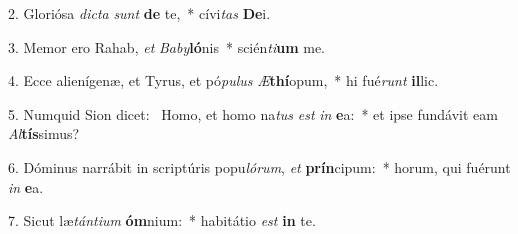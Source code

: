 2. Gloriósa \textit{dic}\textit{ta} \textit{sunt} \textbf{de} te,~*  cívi\textit{tas} \textbf{De}i.\

3. Memor ero Rahab, \textit{et} \textit{Ba}\textit{by}\textbf{ló}nis~*  scién\textit{ti}\textbf{um} me.\

4. Ecce alienígenæ, et Tyrus, et pó\textit{pu}\textit{lus} \textit{Æ}\textbf{thí}opum,~*  hi fué\textit{runt} \textbf{il}lic.\

5. Numquid Sion dicet: \dag\  Homo, et homo na\textit{tus} \textit{est} \textit{in} \textbf{e}a:~*  et ipse fundávit eam \textit{Al}\textbf{tís}simus?\

6. Dóminus narrábit in scriptúris popu\textit{ló}\textit{rum}, \textit{et} \textbf{prín}cipum:~*  horum, qui fuérunt \textit{in} \textbf{e}a.\

7. Sicut læ\textit{tán}\textit{ti}\textit{um} \textbf{óm}nium:~*  habitátio \textit{est} \textbf{in} te.\

